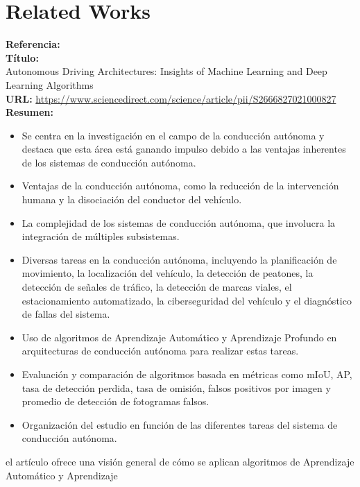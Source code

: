 \documentclass[10pt,letterpaper,final]{article}
\begin{document}
    \section*{Related Works}
    \newline
    \begin{longtable}
        \hline
        \noindent \textbf{Referencia:}~\cite{alam2022cost} \\
        \textbf{Título:} \\
        Autonomous Driving Architectures: Insights of Machine Learning and Deep Learning Algorithms \\
        \textbf{URL:}
        \url{https://www.sciencedirect.com/science/article/pii/S2666827021000827}
        \textbf{Resumen:}
        \begin{itemize}
            \item Se centra en la investigación en el campo de la conducción autónoma y destaca que esta área está ganando
            impulso debido a las ventajas inherentes de los sistemas de conducción autónoma.
            \item Ventajas de la conducción autónoma, como la reducción de la intervención humana y la disociación del conductor del vehículo.
            \item La complejidad de los sistemas de conducción autónoma, que involucra la integración de múltiples subsistemas.
            \item Diversas tareas en la conducción autónoma, incluyendo la planificación de movimiento, la localización del vehículo,
            la detección de peatones, la detección de señales de tráfico, la detección de marcas viales, el estacionamiento automatizado,
            la ciberseguridad del vehículo y el diagnóstico de fallas del sistema.
            \item Uso de algoritmos de Aprendizaje Automático y Aprendizaje Profundo en arquitecturas de conducción autónoma para realizar estas tareas.
            \item Evaluación y comparación de algoritmos basada en métricas como mIoU, AP, tasa de detección perdida, tasa de omisión,
            falsos positivos por imagen y promedio de detección de fotogramas falsos.
            \item Organización del estudio en función de las diferentes tareas del sistema de conducción autónoma.
        \end{itemize}
        el artículo ofrece una visión general de cómo se aplican algoritmos de Aprendizaje Automático y Aprendizaje

\end{longtable}
\end{document}
